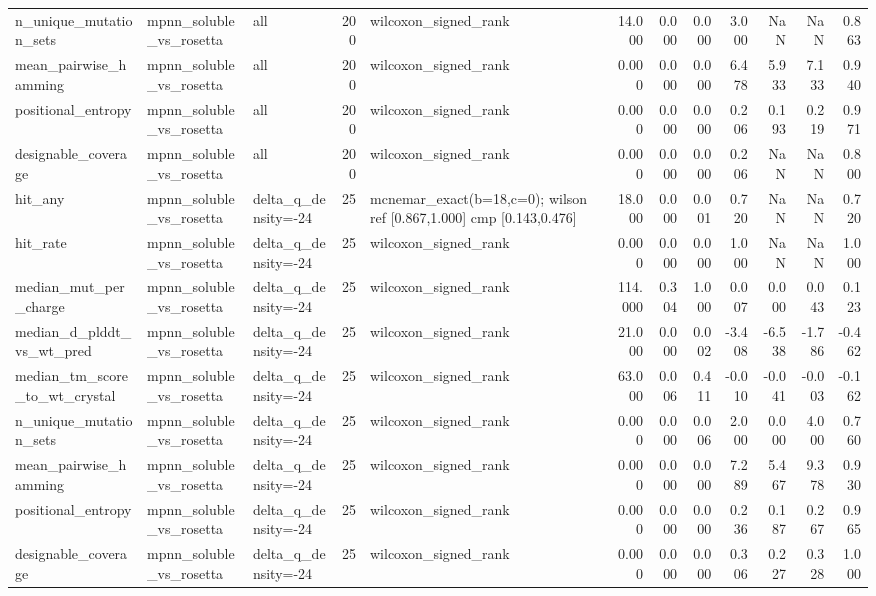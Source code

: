 \begin{table}
{\begin{tabular}{lllrlrrrrrrr}
n\_unique\_mutation\_sets & mpnn\_soluble\_vs\_rosetta & all & 200 & wilcoxon\_signed\_rank & 14.000 & 0.000 & 0.000 & 3.000 & NaN & NaN & 0.863 \\
mean\_pairwise\_hamming & mpnn\_soluble\_vs\_rosetta & all & 200 & wilcoxon\_signed\_rank & 0.000 & 0.000 & 0.000 & 6.478 & 5.933 & 7.133 & 0.940 \\
positional\_entropy & mpnn\_soluble\_vs\_rosetta & all & 200 & wilcoxon\_signed\_rank & 0.000 & 0.000 & 0.000 & 0.206 & 0.193 & 0.219 & 0.971 \\
designable\_coverage & mpnn\_soluble\_vs\_rosetta & all & 200 & wilcoxon\_signed\_rank & 0.000 & 0.000 & 0.000 & 0.206 & NaN & NaN & 0.800 \\
hit\_any & mpnn\_soluble\_vs\_rosetta & delta\_q\_density=-24 & 25 & mcnemar\_exact(b=18,c=0); wilson ref [0.867,1.000] cmp [0.143,0.476] & 18.000 & 0.000 & 0.001 & 0.720 & NaN & NaN & 0.720 \\
hit\_rate & mpnn\_soluble\_vs\_rosetta & delta\_q\_density=-24 & 25 & wilcoxon\_signed\_rank & 0.000 & 0.000 & 0.000 & 1.000 & NaN & NaN & 1.000 \\
median\_mut\_per\_charge & mpnn\_soluble\_vs\_rosetta & delta\_q\_density=-24 & 25 & wilcoxon\_signed\_rank & 114.000 & 0.304 & 1.000 & 0.007 & 0.000 & 0.043 & 0.123 \\
median\_d\_plddt\_vs\_wt\_pred & mpnn\_soluble\_vs\_rosetta & delta\_q\_density=-24 & 25 & wilcoxon\_signed\_rank & 21.000 & 0.000 & 0.002 & -3.408 & -6.538 & -1.786 & -0.462 \\
median\_tm\_score\_to\_wt\_crystal & mpnn\_soluble\_vs\_rosetta & delta\_q\_density=-24 & 25 & wilcoxon\_signed\_rank & 63.000 & 0.006 & 0.411 & -0.010 & -0.041 & -0.003 & -0.162 \\
n\_unique\_mutation\_sets & mpnn\_soluble\_vs\_rosetta & delta\_q\_density=-24 & 25 & wilcoxon\_signed\_rank & 0.000 & 0.000 & 0.006 & 2.000 & 0.000 & 4.000 & 0.760 \\
mean\_pairwise\_hamming & mpnn\_soluble\_vs\_rosetta & delta\_q\_density=-24 & 25 & wilcoxon\_signed\_rank & 0.000 & 0.000 & 0.000 & 7.289 & 5.467 & 9.378 & 0.930 \\
positional\_entropy & mpnn\_soluble\_vs\_rosetta & delta\_q\_density=-24 & 25 & wilcoxon\_signed\_rank & 0.000 & 0.000 & 0.000 & 0.236 & 0.187 & 0.267 & 0.965 \\
designable\_coverage & mpnn\_soluble\_vs\_rosetta & delta\_q\_density=-24 & 25 & wilcoxon\_signed\_rank & 0.000 & 0.000 & 0.000 & 0.306 & 0.227 & 0.328 & 1.000 \\

\end{tabular}}
\end{table}
